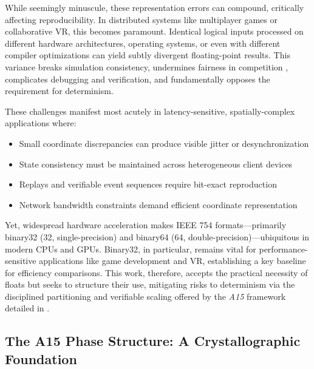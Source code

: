\documentclass[10pt]{article}
\def\AAAB{\textit{A15}}
\begin{document}
While seemingly minuscule, these representation errors can compound, critically affecting reproducibility. In distributed systems like multiplayer games or collaborative VR, this becomes paramount. Identical logical inputs processed on different hardware architectures, operating systems, or even with different compiler optimizations can yield subtly divergent floating-point results. This variance breaks simulation consistency, undermines fairness in competition \cite{Claypool2006}, complicates debugging and verification, and fundamentally opposes the requirement for determinism.

These challenges manifest most acutely in latency-sensitive, spatially-complex applications where:
\begin{itemize} \itemsep0pt
    \item Small coordinate discrepancies can produce visible jitter or desynchronization
    \item State consistency must be maintained across heterogeneous client devices
    \item Replays and verifiable event sequences require bit-exact reproduction
    \item Network bandwidth constraints demand efficient coordinate representation
\end{itemize}

Yet, widespread hardware acceleration makes IEEE 754 formats---primarily binary32 (\SI{32}{\bit}, single-precision) and binary64 (\SI{64}{\bit}, double-precision)---ubiquitous in modern CPUs and GPUs. Binary32, in particular, remains vital for performance-sensitive applications like game development and VR, establishing a key baseline for efficiency comparisons. This work, therefore, accepts the practical necessity of floats but seeks to structure their use, mitigating risks to determinism via the disciplined partitioning and verifiable scaling offered by the \AAAB{} framework detailed in .

\subsection{The A15 Phase Structure: A Crystallographic Foundation}\label{subsec-intro-a15}
\end{document}

